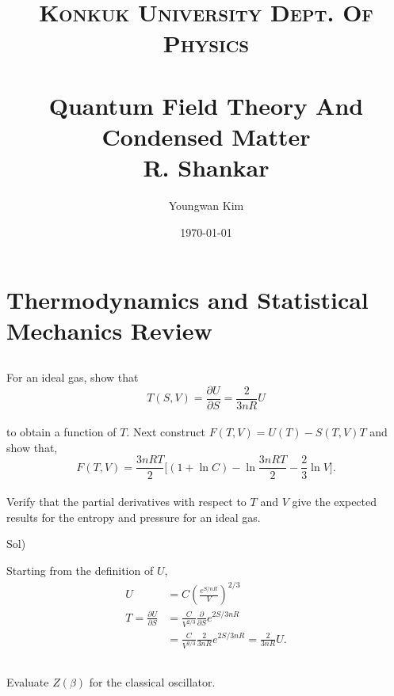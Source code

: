 \documentclass[paper=a4, fontsize=11pt]{scrartcl}
\title{	
\normalfont \normalsize 
\textsc{Konkuk University Dept. Of Physics} \\ [25pt] %
\horrule{1pt} \\[0.4cm] 
\huge Quantum Field Theory And Condensed Matter \\
\vspace{0.1in}
\Large R. Shankar
\horrule{1pt} \\[0.4cm] 
}
\author{Youngwan Kim}
\date{\normalsize\today}
\numberwithin{equation}{section}
\numberwithin{figure}{section}
\numberwithin{table}{section}
\newcommand{\pder}[2]{\frac{\partial #1}{\partial #2}}
\newenvironment{problem}{\subsection{}}{}
\newenvironment{solution}{Sol) \begin{adjustwidth}{0.2in}{}\vspace{0.1in}}{\end{adjustwidth}}
\begin{document}
\maketitle 

\section{Thermodynamics and Statistical Mechanics Review}

\vskip 0.3in

\begin{problem}
	For an ideal gas, show that \\[3pt]
	\begin{equation}
		T(S,V)=\pder{U}{S}=\frac{2}{3nR}U \nonumber
	\end{equation}\\[3pt]
	to obtain a function of $T$. Next construct $F(T,V)=U(T)-S(T,V)T$ and show that,\\[3pt]
	\begin{equation}
		F(T,V)=\frac{3nRT}{2}\Big[(1+\ln{C})-\ln{\frac{3nRT}{2}}-\frac{2}{3}\ln{V}\Big]. \nonumber
	\end{equation} \\[3pt]
	Verify that the partial derivatives with respect to $T$ and $V$ give the expected results for the entropy and pressure for an ideal gas.
\end{problem} 

\vskip 1.5in

\begin{solution}
Starting from the definition of $U$, \\ 
	\begin{equation}
		\begin{split}
		U&=C\left(\frac{e^{S/nR}}{V}\right)^{2/3} \\[3pt]
		 T=\pder{U}{S} &= \frac{C}{V^{2/3}} \pder{}{S} e^{2S/3nR} \\[3pt]
		 &= \frac{C}{V^{2/3}} \frac{2}{3nR}  e^{2S/3nR} = \frac{2}{3nR} U.
		\end{split}
	\end{equation}
\end{solution}

\vskip 0.5in

\begin{problem}
	Evaluate $Z(\beta)$ for the classical oscillator.
\end{problem}\\
\end{document}
